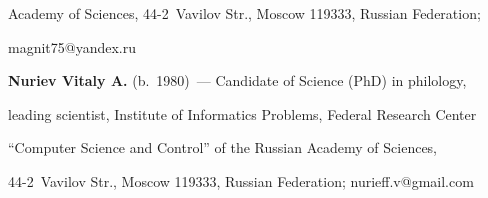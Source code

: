 Academy of Sciences, 44-2~Vavilov Str., Moscow 119333, Russian Federation; 


\mbox{magnit75@yandex.ru}





\vspace*{3pt}





\noindent


\textbf{Nuriev Vitaly A.} (b.\ 1980)~--- Candidate of Science (PhD) in philology, 


leading scientist, Institute of Informatics Problems, Federal Research Center 


``Computer Science and Control'' of the Russian Academy of Sciences, 


44-2~Vavilov Str., Moscow 119333, Russian Federation; \mbox{nurieff.v@gmail.com}





\label{end\stat}





\renewcommand{\bibname}{\protect\rm Литература} 


